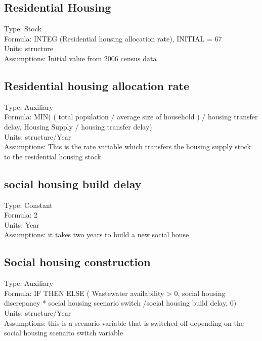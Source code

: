 \documentclass[
  11pt,
]{book}
\begin{document}
\hypertarget{residential-housing}{%
\subsection{Residential Housing}\label{residential-housing}}

Type: Stock\\
Formula: INTEG (Residential housing allocation rate), INITIAL = 67\\
Units: structure\\
Assumptions: Initial value from 2006 census data

\hypertarget{residential-housing-allocation-rate}{%
\subsection{Residential housing allocation rate}\label{residential-housing-allocation-rate}}

Type: Auxiliary\\
Formula: MIN( ( total population / average size of household ) / housing transfer delay, Housing Supply / housing transfer delay)\\
Units: structure/Year\\
Assumptions: This is the rate variable which transfers the housing supply stock to the residential housing stock

\hypertarget{social-housing-build-delay}{%
\subsection{social housing build delay}\label{social-housing-build-delay}}

Type: Constant\\
Formula: 2\\
Units: Year\\
Assumptions: it takes two years to build a new social house

\hypertarget{social-housing-construction}{%
\subsection{Social housing construction}\label{social-housing-construction}}

Type: Auxiliary\\
Formula: IF THEN ELSE ( Wastewater availability \textgreater{} 0, social housing discrepancy * social housing scenario switch
/social housing build delay, 0)\\
Units: structure/Year\\
Assumptions: this is a scenario variable that is switched off depending on the social housing scenario switch variable
\end{document}

